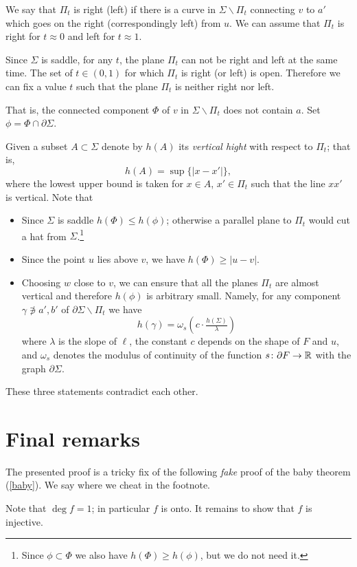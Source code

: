 \documentclass{article}
\begin{document}
We say that $\Pi_t$ is right (left) if there is a curve in $\Sigma\backslash \Pi_t$ connecting $v$ to $a'$ which goes on the right (correspondingly left) from $u$.
We can assume that $\Pi_t$ is right for $t\approx0$ and left for $t\approx1$.

Since $\Sigma$ is saddle, for any $t$, the plane $\Pi_t$ can not be right and left at the same time.
The set of $t\in (0,1)$ for which $\Pi_t$ is right (or left) is open.
Therefore we can fix a value $t$ such that the plane $\Pi_t$ is neither right nor left.

That is, the connected component $\Phi$ of $v$ in $\Sigma\backslash\Pi_t$ does not contain $a$.
Set $\phi=\Phi\cap\partial\Sigma$.

Given a subset $A\subset\Sigma$ denote by $h(A)$ its \emph{vertical hight} with respect to $\Pi_t$;
that is, 
\[h(A)=\sup\{|x-x'|\},\]
where the lowest upper bound is taken for $x\in A$, $x'\in \Pi_t$ such that the line $xx'$ is vertical.
Note that
\begin{itemize}
\item Since $\Sigma$ is saddle $h(\Phi)\le h(\phi)$; otherwise a parallel plane to $\Pi_t$ would cut a hat from $\Sigma$.\footnote{Since $\phi\subset\Phi$ we also have $h(\Phi)\ge h(\phi)$, but we do not need it.}
\item Since the point $u$ lies above $v$, we have $h(\Phi)\ge |u-v|$.
\item Choosing $w$ close to $v$, we can ensure that all the planes $\Pi_t$ are almost vertical and therefore $h(\phi)$ is arbitrary small.
Namely, for any component $\gamma\not\ni a',b'$ of $\partial\Sigma\backslash\Pi_t$ we have 
\[h(\gamma)=\omega_s(c\cdot\tfrac{h(\Sigma)}{\lambda})\]
where $\lambda$ is the slope of $\ell$, 
the constant $c$ depends on the shape of $F$ and $u$,  and 
$\omega_s$ denotes the modulus of continuity of the function $s\colon\partial F\to \mathbb{R}$ with the graph $\partial\Sigma$.
\end{itemize}
These three statements contradict each other.
\qeds




\section{Final remarks}

The presented proof is a tricky fix of the following \emph{fake} proof of the baby theorem (\ref{baby}).
We say where we cheat in the footnote.

Note that $\deg f=1$;
in particular $f$ is onto.
It remains to show that $f$ is injective.
\end{document}
